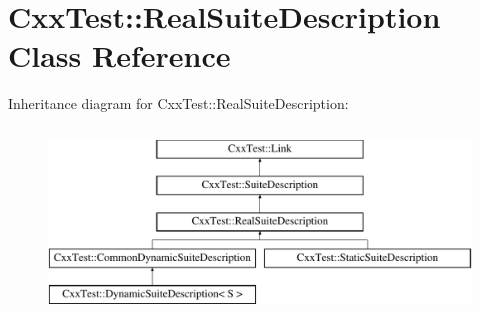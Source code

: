 \hypertarget{classCxxTest_1_1RealSuiteDescription}{\section{Cxx\-Test\-:\-:Real\-Suite\-Description Class Reference}
\label{classCxxTest_1_1RealSuiteDescription}
}
Inheritance diagram for Cxx\-Test\-:\-:Real\-Suite\-Description\-:\begin{figure}[H]
\begin{center}
\leavevmode
\includegraphics[height=5.000000cm]{classCxxTest_1_1RealSuiteDescription}
\end{center}
\end{figure}
